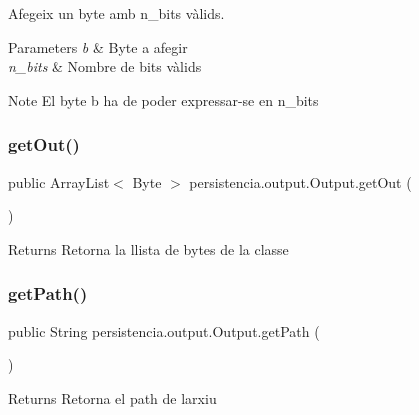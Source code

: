 Afegeix un byte amb n\+\_\+bits vàlids. 


\begin{DoxyParams}{Parameters}
{\em b} & Byte a afegir \\
\hline
{\em n\+\_\+bits} & Nombre de bits vàlids \\
\hline
\end{DoxyParams}
\begin{DoxyNote}{Note}
El byte b ha de poder expressar-\/se en n\+\_\+bits 
\end{DoxyNote}
\mbox{\label{classpersistencia_1_1output_1_1Output_ae4f870c86bed5b445125df989b313b9f}} 
\subsubsection{\texorpdfstring{get\+Out()}{getOut()}}
{\footnotesize\ttfamily public Array\+List$<$ Byte $>$ persistencia.\+output.\+Output.\+get\+Out (\begin{DoxyParamCaption}{ }\end{DoxyParamCaption})\hspace{0.3cm}{\ttfamily [inline]}}

\begin{DoxyReturn}{Returns}
Retorna la llista de bytes de la classe 
\end{DoxyReturn}
\mbox{\label{classpersistencia_1_1output_1_1Output_ae33fc52334f791b6d4d7aebf2931df8d}} 
\subsubsection{\texorpdfstring{get\+Path()}{getPath()}}
{\footnotesize\ttfamily public String persistencia.\+output.\+Output.\+get\+Path (\begin{DoxyParamCaption}{ }\end{DoxyParamCaption})\hspace{0.3cm}{\ttfamily [inline]}}

\begin{DoxyReturn}{Returns}
Retorna el path de l\textquotesingle{}arxiu 
\end{DoxyReturn}
\mbox{\label{classpersistencia_1_1output_1_1Output_a01f862217e01efb59bc2eff3fe54006f}} 
